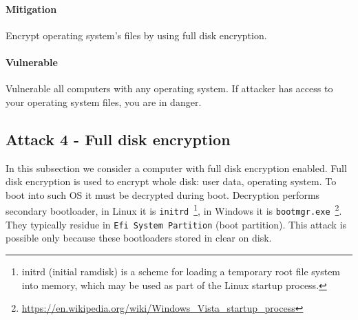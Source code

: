\paragraph*{Mitigation}
Encrypt operating system's files by using full disk encryption.

\paragraph*{Vulnerable}
Vulnerable all computers with any operating system. If attacker has access to your operating system files, you are in danger.


\subsection{Attack 4 - Full disk encryption}
In this subsection we consider a computer with full disk encryption enabled. Full disk encryption is used to encrypt whole disk: user data, operating system. To boot into such OS it must be decrypted during boot. Decryption performs secondary bootloader, in Linux it is \texttt{initrd}~\footnote{initrd (initial ramdisk) is a scheme for loading a temporary root file system into memory, which may be used as part of the Linux startup process.}, in Windows it is \texttt{bootmgr.exe}~\footnote{\url{https://en.wikipedia.org/wiki/Windows_Vista_startup_process}}. They typically residue in \texttt{Efi System Partition} (boot partition). This attack is possible only because these bootloaders stored in clear on disk.

